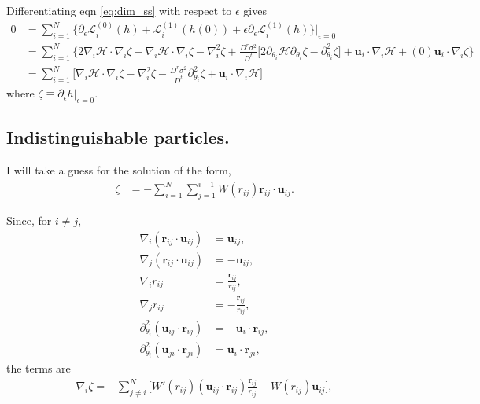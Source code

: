 \documentclass{article}
\begin{document}
Differentiating eqn \ref{eq:dim_ss} with respect to $\epsilon$ gives
\begin{align}\label{eq:first_perturb_DE}
  0
  &=\sum_{i=1}^N\big\{\partial_{\epsilon}\mathcal{L}_i^{(0)}(h)
    + \mathcal{L}_i^{(1)}(h(0))
    +\epsilon\partial_{\epsilon}\mathcal{L}_i^{(1)}
    (h)\big\}\bigg|_{\epsilon=0}\nonumber\\
  &=\sum_{i=1}^N\big\{2\nabla_i \mathcal{H}\cdot\nabla_i\zeta
    - \nabla_i\mathcal{H}\cdot\nabla_i\zeta
    -\nabla_i^2\zeta+\frac{D^r\sigma^2}{D^t}
    \big[2\partial_{\theta_i}\mathcal{H}\partial_{\theta_i}\zeta
    -\partial_{\theta_i}^2\zeta\big]
    + \bm{u}_i\cdot\nabla_i\mathcal{H}
    +(0)\bm{u}_i\cdot\nabla_i\zeta\big\}\nonumber\\
  &=\sum_{i=1}^N\big[\nabla_i \mathcal{H}\cdot\nabla_i\zeta
    -\nabla_i^2\zeta - \frac{D^r\sigma^2}{D^t}
    \partial_{\theta_i}^2\zeta
    + \bm{u}_i\cdot\nabla_i\mathcal{H}\big]
\end{align}
where $\zeta\equiv\partial_{\epsilon}h|_{\epsilon=0}$.

\subsection{Indistinguishable particles.}

I will take a guess for the solution of the form,
\begin{align}\label{eq:zetaform}
  \zeta &= -\sum_{i=1}^N\sum_{j=1}^{i-1}
      W(r_{ij})\bm{r}_{ij}\cdot\bm{u}_{ij}.
\end{align}

Since, for $i\neq j$,
\begin{align}
  \nabla_i(\bm{r}_{ij}\cdot\bm{u}_{ij}) &= \bm{u}_{ij},\\
  \nabla_j(\bm{r}_{ij}\cdot\bm{u}_{ij}) &= -\bm{u}_{ij},\\
  \nabla_i r_{ij} &=\frac{\bm{r}_{ij}}{r_{ij}},\\
  \nabla_j r_{ij} &=-\frac{\bm{r}_{ij}}{r_{ij}},\\
  \partial_{\theta_i}^2(\bm{u}_{ij}\cdot\bm{r}_{ij})&=-\bm{u}_i\cdot\bm{r}_{ij},\\
  \partial_{\theta_i}^2(\bm{u}_{ji}\cdot\bm{r}_{ji})&=\bm{u}_i\cdot\bm{r}_{ji},
\end{align}
the terms are
\begin{align}
  \nabla_{i}\zeta = -\sum_{j\neq i}^N \bigg[W'(r_{ij})
  (\bm{u}_{ij}\cdot\bm{r}_{ij})\frac{\bm{r}_{ij}}{r_{ij}}
  +W(r_{ij})\bm{u}_{ij}\bigg],
\end{align}
\end{document}

